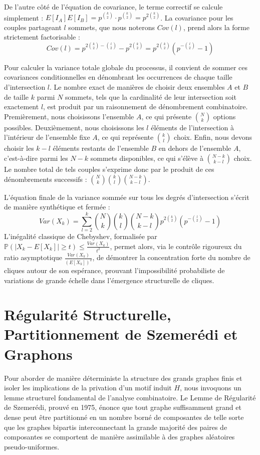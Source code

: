 \documentclass[11pt, a4paper]{article}
\begin{document}
De l'autre côté de l'équation de covariance, le terme correctif se calcule simplement :
$E[I_A]E[I_B] = p^{\binom{k}{2}} \cdot p^{\binom{k}{2}} = p^{2\binom{k}{2}}$.
La covariance pour les couples partageant $l$ sommets, que nous noterons $Cov(l)$, prend alors la forme strictement factorisable :
$$Cov(l) = p^{2\binom{k}{2} - \binom{l}{2}} - p^{2\binom{k}{2}} = p^{2\binom{k}{2}} \left( p^{-\binom{l}{2}} - 1 \right)$$

Pour calculer la variance totale globale du processus, il convient de sommer ces covariances conditionnelles en dénombrant les occurrences de chaque taille d'intersection $l$.
Le nombre exact de manières de choisir deux ensembles $A$ et $B$ de taille $k$ parmi $N$ sommets, tels que la cardinalité de leur intersection soit exactement $l$, est produit par un raisonnement de dénombrement combinatoire.
Premièrement, nous choisissons l'ensemble $A$, ce qui présente $\binom{N}{k}$ options possibles.
Deuxièmement, nous choisissons les $l$ éléments de l'intersection à l'intérieur de l'ensemble fixe $A$, ce qui représente $\binom{k}{l}$ choix.
Enfin, nous devons choisir les $k-l$ éléments restants de l'ensemble $B$ en dehors de l'ensemble $A$, c'est-à-dire parmi les $N-k$ sommets disponibles, ce qui s'élève à $\binom{N-k}{k-l}$ choix.
Le nombre total de tels couples s'exprime donc par le produit de ces dénombrements successifs :
$\binom{N}{k} \binom{k}{l} \binom{N-k}{k-l}$.

L'équation finale de la variance sommée sur tous les degrés d'intersection s'écrit de manière synthétique et fermée :
$$Var(X_k) = \sum_{l=2}^{k} \binom{N}{k} \binom{k}{l} \binom{N-k}{k-l} p^{2\binom{k}{2}} \left( p^{-\binom{l}{2}} - 1 \right)$$
L'inégalité classique de Chebyshev, formalisée par $\mathbb{P}(|X_k - E[X_k]| \ge t) \le \frac{Var(X_k)}{t^2}$, permet alors, via le contrôle rigoureux du ratio asymptotique $\frac{Var(X_k)}{(E[X_k])^2}$, de démontrer la concentration forte du nombre de cliques autour de son espérance, prouvant l'impossibilité probabiliste de variations de grande échelle dans l'émergence structurelle de cliques.

\newpage
\section{Régularité Structurelle, Partitionnement de Szemerédi et Graphons}

Pour aborder de manière déterministe la structure des grands graphes finis et isoler les implications de la privation d'un motif induit $H$, nous invoquons un lemme structurel fondamental de l'analyse combinatoire.
Le Lemme de Régularité de Szemerédi, prouvé en 1975, énonce que tout graphe suffisamment grand et dense peut être partitionné en un nombre borné de composantes de telle sorte que les graphes bipartis interconnectant la grande majorité des paires de composantes se comportent de manière assimilable à des graphes aléatoires pseudo-uniformes.
\end{document}
